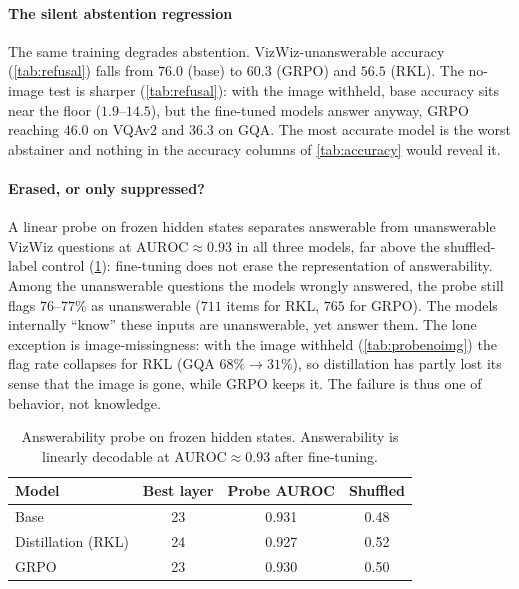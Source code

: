 \documentclass[10pt,twocolumn,letterpaper]{article}
\begin{document}
\begin{table}[t]
\end{table}









\paragraph{The silent abstention regression}
\label{sec:regression}

The same training degrades abstention. VizWiz-unanswerable accuracy (\cref{tab:refusal})
falls from $76.0$ (base) to $60.3$ (GRPO) and $56.5$ (RKL). The no-image test is sharper
(\cref{tab:refusal}): with the image withheld, base accuracy sits near the floor
($1.9$--$14.5$), but the fine-tuned models answer anyway, GRPO reaching $46.0$ on VQAv2
and $36.3$ on GQA. The most accurate model is the worst abstainer and nothing in the
accuracy columns of \cref{tab:accuracy} would reveal it.



\paragraph{Erased, or only suppressed?}
\label{sec:rq1}

A linear probe on frozen hidden states separates answerable from unanswerable VizWiz
questions at $\text{AUROC}\approx0.93$ in all three models, far above the shuffled-label
control (\cref{tab:probe}): fine-tuning does not erase the representation of
answerability. Among the unanswerable questions the models wrongly answered, the probe
still flags $76$--$77\%$ as unanswerable ($711$ items for RKL, $765$ for GRPO). The models
internally ``know'' these inputs are unanswerable, yet answer them. The lone exception is
image-missingness: with the image withheld (\cref{tab:probenoimg}) the flag rate
collapses for RKL (GQA $68\%\!\rightarrow\!31\%$), so distillation has partly lost its
sense that the image is gone, while GRPO keeps it. The failure is thus one of behavior,
not knowledge.

\begin{table}[tb]
\centering
\small
\caption{Answerability probe on frozen hidden states. Answerability is linearly decodable
at $\text{AUROC}\approx0.93$ after fine-tuning.}
\label{tab:probe}
\begin{tabular}{@{}lccc@{}}
\toprule
Model & Best layer & Probe AUROC & Shuffled \\
\midrule
Base               & 23 & 0.931 & 0.48 \\
Distillation (RKL) & 24 & 0.927 & 0.52 \\
GRPO               & 23 & 0.930 & 0.50 \\
\bottomrule
\end{tabular}
\end{table}
\end{document}
